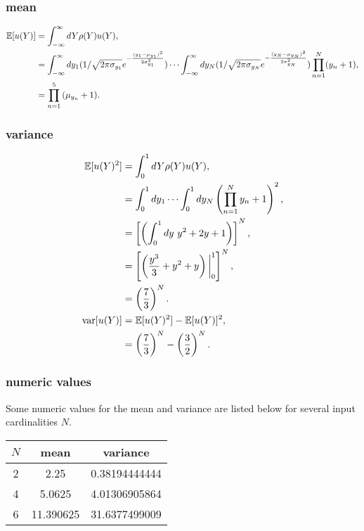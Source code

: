 \subsubsection{mean}
\begin{align}
\mathbb{E}[ u(Y)] &=\int_{-\infty}^\infty dY \rho(Y)u(Y),\notag \\
  &=\int_{-\infty}^\infty dy_1 (1/\sqrt{2 \pi \sigma_{y_1}}e^{-\frac{(y_1-\mu_{y_1})^2}{2\sigma_{y_1}^2}})\cdots\int_{-\infty}^\infty dy_N (1/\sqrt{2 \pi \sigma_{y_N}}e^{-\frac{(y_N-\mu_{y_N})^2}{2\sigma_{y_N}^2}})\prod_{n=1}^N (y_n+1),\\
  &=\prod_{n=1}^5{(\mu_{y_n}+1)}.\notag
\end{align}

\subsubsection{variance}
\begin{align}
\mathbb{E}[ u(Y)^2] &= \int_{0}^1 dY \rho(Y)u(Y),\\
  &=\int_{0}^1 dy_1\cdots\int_{0}^1 dy_N \left(\prod_{n=1}^N y_n+1\right)^2,\\
  &=\left[\left(\int_{0}^1 dy\ y^2+2y+1 \right)\right]^N,\\
  &=\left[\left(\frac{y^3}{3}+y^2+y \right)\bigg|_{0}^1 \right]^N,\\
  &=\left(\frac{7}{3}\right)^N.\\
\text{var}[u(Y)] &= \mathbb{E}[ u(Y)^2]-\mathbb{E}[ u(Y)]^2,\\
  &= \left(\frac{7}{3}\right)^N-\left(\frac{3}{2}\right)^N.
\end{align}

\subsubsection{numeric values}
Some numeric values for the mean and variance are listed below for several input cardinalities $N$.
\begin{table}[h!]
  \centering
  \begin{tabular}{c|c|c}
    $N$ & mean & variance \\ \hline
    2 & 2.25      & 0.38194444444 \\
    4 & 5.0625    & 4.01306905864 \\
    6 & 11.390625 & 31.6377499009
  \end{tabular}
\end{table}

